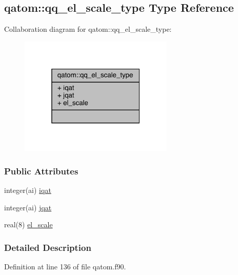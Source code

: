 \hypertarget{structqatom_1_1qq__el__scale__type}{\subsection{qatom\-:\-:qq\-\_\-el\-\_\-scale\-\_\-type Type Reference}
\label{structqatom_1_1qq__el__scale__type}
}


Collaboration diagram for qatom\-:\-:qq\-\_\-el\-\_\-scale\-\_\-type\-:
\nopagebreak
\begin{figure}[H]
\begin{center}
\leavevmode
\includegraphics[width=208pt]{structqatom_1_1qq__el__scale__type__coll__graph}
\end{center}
\end{figure}
\subsubsection*{Public Attributes}
\begin{DoxyCompactItemize}
\item 
integer(ai) \hyperlink{structqatom_1_1qq__el__scale__type_ae9849b0bff78348841463201eb858efd}{iqat}
\item 
integer(ai) \hyperlink{structqatom_1_1qq__el__scale__type_abb300c45db069338246c6f6a3ac5a8e8}{jqat}
\item 
real(8) \hyperlink{structqatom_1_1qq__el__scale__type_af62199192e0366f4e52f2b55e4504343}{el\-\_\-scale}
\end{DoxyCompactItemize}


\subsubsection{Detailed Description}


Definition at line 136 of file qatom.\-f90.



